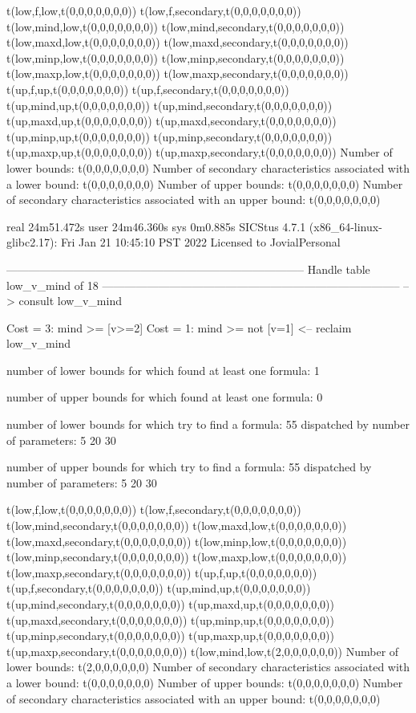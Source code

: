 t(low,f,low,t(0,0,0,0,0,0,0))
t(low,f,secondary,t(0,0,0,0,0,0,0))
t(low,mind,low,t(0,0,0,0,0,0,0))
t(low,mind,secondary,t(0,0,0,0,0,0,0))
t(low,maxd,low,t(0,0,0,0,0,0,0))
t(low,maxd,secondary,t(0,0,0,0,0,0,0))
t(low,minp,low,t(0,0,0,0,0,0,0))
t(low,minp,secondary,t(0,0,0,0,0,0,0))
t(low,maxp,low,t(0,0,0,0,0,0,0))
t(low,maxp,secondary,t(0,0,0,0,0,0,0))
t(up,f,up,t(0,0,0,0,0,0,0))
t(up,f,secondary,t(0,0,0,0,0,0,0))
t(up,mind,up,t(0,0,0,0,0,0,0))
t(up,mind,secondary,t(0,0,0,0,0,0,0))
t(up,maxd,up,t(0,0,0,0,0,0,0))
t(up,maxd,secondary,t(0,0,0,0,0,0,0))
t(up,minp,up,t(0,0,0,0,0,0,0))
t(up,minp,secondary,t(0,0,0,0,0,0,0))
t(up,maxp,up,t(0,0,0,0,0,0,0))
t(up,maxp,secondary,t(0,0,0,0,0,0,0))
Number of lower bounds:                                             t(0,0,0,0,0,0,0)
Number of secondary characteristics associated with a lower bound:  t(0,0,0,0,0,0,0)
Number of upper bounds:                                             t(0,0,0,0,0,0,0)
Number of secondary characteristics associated with an upper bound: t(0,0,0,0,0,0,0)

real	24m51.472s
user	24m46.360s
sys	0m0.885s
SICStus 4.7.1 (x86_64-linux-glibc2.17): Fri Jan 21 10:45:10 PST 2022
Licensed to JovialPersonal


--------------------------------------------------------------------------------
Handle table low_v_mind of 18
--------------------------------------------------------------------------------
--> consult low_v_mind

Cost =  3:  mind >= [v>=2]
Cost =  1:  mind >= not [v=1]
<-- reclaim low_v_mind

number of lower bounds for which found at least one formula: 1

number of upper bounds for which found at least one formula: 0

number of lower bounds for which try to find a formula: 55
dispatched by number of parameters: 5  20  30

number of upper bounds for which try to find a formula: 55
dispatched by number of parameters: 5  20  30

t(low,f,low,t(0,0,0,0,0,0,0))
t(low,f,secondary,t(0,0,0,0,0,0,0))
t(low,mind,secondary,t(0,0,0,0,0,0,0))
t(low,maxd,low,t(0,0,0,0,0,0,0))
t(low,maxd,secondary,t(0,0,0,0,0,0,0))
t(low,minp,low,t(0,0,0,0,0,0,0))
t(low,minp,secondary,t(0,0,0,0,0,0,0))
t(low,maxp,low,t(0,0,0,0,0,0,0))
t(low,maxp,secondary,t(0,0,0,0,0,0,0))
t(up,f,up,t(0,0,0,0,0,0,0))
t(up,f,secondary,t(0,0,0,0,0,0,0))
t(up,mind,up,t(0,0,0,0,0,0,0))
t(up,mind,secondary,t(0,0,0,0,0,0,0))
t(up,maxd,up,t(0,0,0,0,0,0,0))
t(up,maxd,secondary,t(0,0,0,0,0,0,0))
t(up,minp,up,t(0,0,0,0,0,0,0))
t(up,minp,secondary,t(0,0,0,0,0,0,0))
t(up,maxp,up,t(0,0,0,0,0,0,0))
t(up,maxp,secondary,t(0,0,0,0,0,0,0))
t(low,mind,low,t(2,0,0,0,0,0,0))
Number of lower bounds:                                             t(2,0,0,0,0,0,0)
Number of secondary characteristics associated with a lower bound:  t(0,0,0,0,0,0,0)
Number of upper bounds:                                             t(0,0,0,0,0,0,0)
Number of secondary characteristics associated with an upper bound: t(0,0,0,0,0,0,0)

